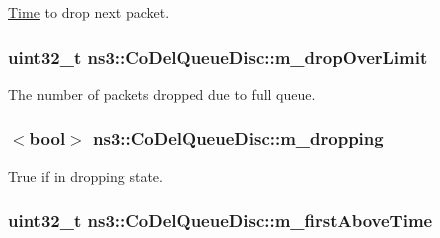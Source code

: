 \hyperlink{classns3_1_1Time}{Time} to drop next packet. 

\subsubsection[{\texorpdfstring{m\+\_\+drop\+Over\+Limit}{m_dropOverLimit}}]{\setlength{\rightskip}{0pt plus 5cm}uint32\+\_\+t ns3\+::\+Co\+Del\+Queue\+Disc\+::m\+\_\+drop\+Over\+Limit\hspace{0.3cm}{\ttfamily [private]}}\hypertarget{classns3_1_1CoDelQueueDisc_a742127eaa6469536b37a40e2c31292b4}{}\label{classns3_1_1CoDelQueueDisc_a742127eaa6469536b37a40e2c31292b4}


The number of packets dropped due to full queue. 

\subsubsection[{\texorpdfstring{m\+\_\+dropping}{m_dropping}}]{$<$bool$>$ ns3\+::\+Co\+Del\+Queue\+Disc\+::m\+\_\+dropping\hspace{0.3cm}{\ttfamily [private]}}\hypertarget{classns3_1_1CoDelQueueDisc_ae6b02968204bd5c2e6d68e532ce679c4}{}\label{classns3_1_1CoDelQueueDisc_ae6b02968204bd5c2e6d68e532ce679c4}


True if in dropping state. 

\subsubsection[{\texorpdfstring{m\+\_\+first\+Above\+Time}{m_firstAboveTime}}]{\setlength{\rightskip}{0pt plus 5cm}uint32\+\_\+t ns3\+::\+Co\+Del\+Queue\+Disc\+::m\+\_\+first\+Above\+Time\hspace{0.3cm}{\ttfamily [private]}}\hypertarget{classns3_1_1CoDelQueueDisc_acd66659e7066b6d1d322fee745e43adc}{}\label{classns3_1_1CoDelQueueDisc_acd66659e7066b6d1d322fee745e43adc}


